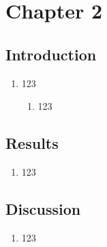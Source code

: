 \chapter{Chapter 2}
\label{ch:chapter2}


\newcommand{\Ainc}{\textit{A. incana}}
\newcommand{\Ball}{\textit{B. alleghaniensis}}
\newcommand{\Bpap}{\textit{B. papyrifera}}
\newcommand{\Bpop}{\textit{B. populifolia}}

\newcommand{\Arub}{\textit{A. rubrum}}
\newcommand{\Asac}{\textit{A. saccharum}}
\newcommand{\Afla}{\textit{A. flava}}
\newcommand{\Bnig}{\textit{B. nigra}}
\newcommand{\Cgla}{\textit{C. glabra}}
\newcommand{\Cova}{\textit{C. ovata}}
\newcommand{\Pdel}{\textit{P. deltoides}}
\newcommand{\Qalb}{\textit{Q. alba}}
\newcommand{\Qrub}{\textit{Q. rubra}}
\newcommand{\Tame}{\textit{T. americana}}   



\section*{Introduction}
\begin{enumerate}
\item 123
  \begin{enumerate}
  \item 123
  \end{enumerate}
\end{enumerate}

\clearpage
\section*{Results}
\begin{enumerate}
\item 123
\end{enumerate}


\clearpage
\section*{Discussion}
\begin{enumerate}
\item 123
\end{enumerate}

